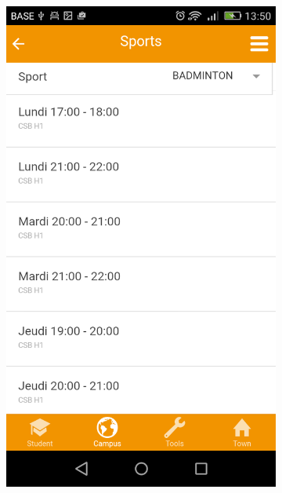 \documentclass{eplmastersthesis}
\begin{document}
\begin{figure}
    \centering
\begin{subfigure}[b]{0.3\textwidth}
        \includegraphics[width=\textwidth]{Images/Application_screens/Screenshot_2016-06-06-13-50-02.png}
    \end{subfigure}
    ~ %
    \begin{subfigure}[b]{0.3\textwidth}

\end{subfigure}
\end{figure}
\end{document}

